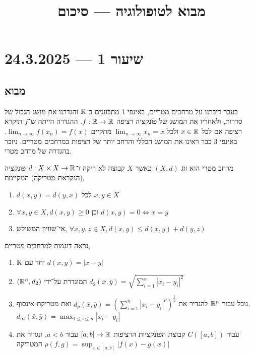 
\title{מבוא לטופולוגיה --- סיכום}
\setcounter{secnumdepth}{2}

\usepackage{fancyhdr}
\pagestyle{fancy}
\renewcommand{\headrulewidth}{0pt}


\maketitle
\maketitleprint[purple]

\tableofcontents

\section{שיעור 1 --- 24.3.2025}
\subsection{מבוא}
בעבר דיברנו על מרחבים מטריים, באינפי 1 מתבוננים ב־$\mathbb{R}$ והגדרנו את מושג הגבול של סדרות, ולאחריו את המושג של פונקציה רציפה $f : \mathbb{R} \to \mathbb{R}$.
ההגדרה הייתה ש־$f$ תיקרא רציפה אם לכל $x \in \mathbb{R}$ ולכל $\lim_{n \to \infty} x_n = x$ מתקיים $\lim_{n \to \infty} f(x_n) = f(x)$.
באינפי 3 כבר ראינו את המושג הכללי והרחב יותר של רציפות במרחבים מטריים.
ניזכר בהגדרה של מרחב מטרי.
\begin{definition}
	מרחב מטרי הוא זוג $(X, d)$ כאשר $X$ קבוצה לא ריקה ו־$d : X \times X \to \mathbb{R}$ פונקציה (הנקראת מטריקה) המקיימת,
	\begin{enumerate}
		\item $d(x, y) = d(y, x)$ לכל $x, y \in X$
		\item $\forall x, y \in X, d(x, y) \ge 0$ וכן $d(x, y) = 0 \iff x = y$
		\item אי־שוויון המשולש, $\forall x, y, z \in X, d(x, y) \le d(x, y) + d(y, z)$
	\end{enumerate}
\end{definition}
\begin{example}
	נראה דוגמות למרחבים מטריים,
	\begin{enumerate}
		\item $\mathbb{R}$ יחד עם $d(x, y) = |x - y|$
		\item $(\mathbb{R}^n, d_2)$ המוגדרת על־ידי $d_2(\bar{x}, \bar{y}) = \sqrt{\sum_{i = 1}^{n} {|x_i - y_i|}^2}$
		\item נוכל עבור $\mathbb{R}^n$ להגדיר את $d_p(\bar{x}, \bar{y}) = {(\sum_{i = 1}^{n} {|x_i - y_i|}^p)}^\frac{1}{p}$ ואת מטריקת אינסוף, $d_\infty(\bar{x}, \bar{y}) = \max_{1 \le i \le n} |x_i - y_i|$
		\item עבור $C([a, b])$ קבוצת הפונקציות הרציפות $[a, b] \to \mathbb{R}$ עבור $a < b$, ונגדיר את המטריקה $\rho(f, g) = \sup_{x \in [a, b]} |f(x) - g(x)|$
	\end{enumerate}
\end{example}
